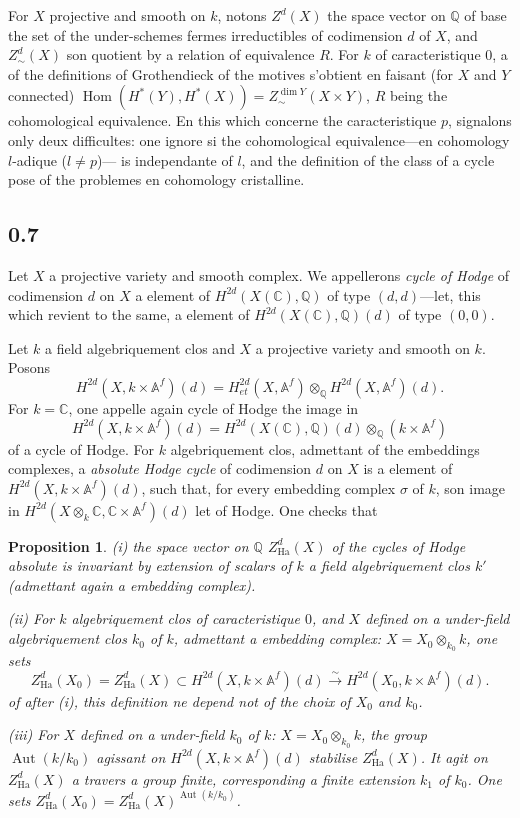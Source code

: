 \documentclass[12pt,a4paper]{article}
\theoremstyle{plain}
\newtheorem{proposition}[theorem]{Proposition}
\theoremstyle{definition}
\theoremstyle{remark}
\DeclareMathOperator{\Hom}{Hom}
\DeclareMathOperator{\Aut}{Aut}
\newcommand{\Q}{\mathbb{Q}}
\newcommand{\C}{\mathbb{C}}
\newcommand{\A}{\mathbb{A}}
\begin{document}
For $X$ projective and smooth on $k$, notons $Z^d(X)$ the space vector on $\Q$ of base
the set of the under-schemes fermes irreductibles of codimension $d$ of $X$, and $Z^d_\sim(X)$
son quotient by a relation of equivalence $R$. For $k$ of caracteristique $0$, a of the
definitions of Grothendieck of the motives s'obtient en faisant (for $X$ and $Y$ connected)
$\Hom(H^*(Y), H^*(X)) = Z^{\dim Y}_\sim(X \times Y)$, $R$ being the cohomological equivalence.
En this which concerne the caracteristique $p$, signalons only deux difficultes:
one ignore si the cohomological equivalence---en cohomology $l$-adique ($l \neq p$)---
is independante of $l$, and the definition of the class of a cycle pose of the problemes en
cohomology cristalline.

\subsection*{0.7}

Let $X$ a projective variety and smooth complex. We appellerons \emph{cycle of Hodge}
of codimension $d$ on $X$ a element of $H^{2d}(X(\C), \Q)$ of type $(d,d)$---let, this which
revient to the same, a element of $H^{2d}(X(\C), \Q)(d)$ of type $(0,0)$.

Let $k$ a field algebriquement clos and $X$ a projective variety and smooth on $k$.
Posons
\[
H^{2d}(X, k \times \A^f)(d) = H^{2d}_{et}(X, \A^f) \otimes_{\Q} H^{2d}(X, \A^f)(d).
\]
For $k = \C$, one appelle again cycle of Hodge the image in
\[
H^{2d}(X, k \times \A^f)(d) = H^{2d}(X(\C), \Q)(d) \otimes_{\Q} (k \times \A^f)
\]
of a cycle of Hodge. For $k$ algebriquement clos, admettant of the embeddings complexes,
a \emph{absolute Hodge cycle} of codimension $d$ on $X$ is a element of
$H^{2d}(X, k \times \A^f)(d)$, such that, for every embedding complex $\sigma$ of $k$, son image
in $H^{2d}(X \otimes_k \C, \C \times \A^f)(d)$ let of Hodge. One checks that

\begin{proposition}\label{prop:0.8}
\textup{(i)} the space vector on $\Q$ $Z^d_{\text{Ha}}(X)$ of the cycles of Hodge absolute is
invariant by extension of scalars of $k$ a field algebriquement clos $k'$ (admettant
again a embedding complex).

\textup{(ii)} For $k$ algebriquement clos of caracteristique $0$, and $X$ defined on a under-field
algebriquement clos $k_0$ of $k$, admettant a embedding complex:
$X = X_0 \otimes_{k_0} k$, one sets
\[
Z^d_{\text{Ha}}(X_0) = Z^d_{\text{Ha}}(X) \subset H^{2d}(X, k \times \A^f)(d) \xrightarrow{\sim} H^{2d}(X_0, k \times \A^f)(d).
\]
of after (i), this definition ne depend not of the choix of $X_0$ and $k_0$.

\textup{(iii)} For $X$ defined on a under-field $k_0$ of $k$: $X = X_0 \otimes_{k_0} k$, the group
$\Aut(k/k_0)$ agissant on $H^{2d}(X, k \times \A^f)(d)$ stabilise $Z^d_{\text{Ha}}(X)$. It agit on
$Z^d_{\text{Ha}}(X)$ a travers a group finite, corresponding a finite extension $k_1$ of $k_0$.
One sets $Z^d_{\text{Ha}}(X_0) = Z^d_{\text{Ha}}(X)^{\Aut(k/k_0)}$.
\end{proposition}
\end{document}
